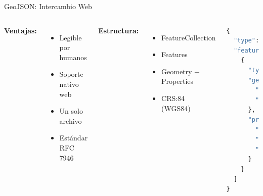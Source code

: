 \documentclass[10pt,aspectratio=169]{beamer}
\begin{document}
\begin{frame}[fragile]{GeoJSON: Intercambio Web}
    \begin{columns}[T]
        \footnotesize
        \textbf{Ventajas:}
        \begin{itemize}
            \item Legible por humanos
            \item Soporte nativo web
            \item Un solo archivo
            \item Estándar RFC 7946
        \end{itemize}
        
        \textbf{Estructura:}
        \begin{itemize}
            \item FeatureCollection
            \item Features
            \item Geometry + Properties
            \item CRS:84 (WGS84)
        \end{itemize}
        
        \begin{lstlisting}[language=Python]
{
  "type": "FeatureCollection",
  "features": [
    {
      "type": "Feature",
      "geometry": {
        "type": "Point",
        "coordinates": [-70.651, -33.438]
      },
      "properties": {
        "nombre": "USACH",
        "tipo": "Universidad",
        "estudiantes": 22000
      }
    }
  ]
}
        \end{lstlisting}
    \end{columns}
\end{frame}
\end{document}
